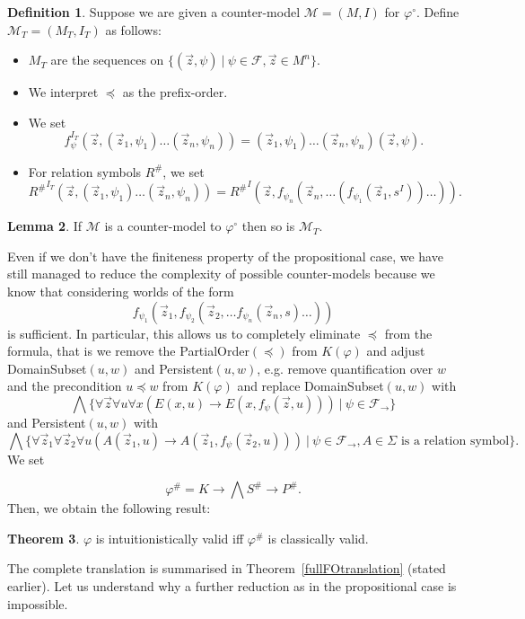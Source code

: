 \documentclass[a4paper,12pt]{report}
\theoremstyle{definition}
\newtheorem{theorem}{Theorem}[section]
\theoremstyle{definition}
\theoremstyle{definition}
\newtheorem{lemma}[theorem]{Lemma}
\theoremstyle{definition}
\theoremstyle{definition}
\newtheorem{definition}[theorem]{Definition}
\theoremstyle{definition}
\theoremstyle{definition}
\begin{document}
	\begin{definition}
		Suppose we are given a counter-model $\mathcal M = (M, I)$ for $\varphi^\circ$. Define $\mathcal M_T = (M_T, I_T)$ as follows:
		\begin{itemize}
			\item $M_T$ are the sequences on $\{(\vec z, \psi)\:|\:\psi\in \mathcal F, \vec z\in M^n\}$.
			\item We interpret $\preceq$ as the prefix-order.
			\item We set $$f_\psi^{I_T}(\vec z, (\vec z_1, \psi_1)\dots (\vec z_n, \psi_n)) = (\vec z_1, \psi_1)\dots (\vec z_n, \psi_n)(\vec z, \psi).$$
			\item For relation symbols $R^\#$, we set $${R^\#}^{I_T}(\vec z, (\vec z_1, \psi_1)\dots (\vec z_n, \psi_n)) = {R^\#}^I(\vec z, f_{\psi_n}(\vec z_n, \dots(f_{\psi_1}(\vec z_1, s^I))\dots)).$$
		\end{itemize}
	\end{definition}
	
	\begin{lemma}
		If $\mathcal M$ is a counter-model to $\varphi^\circ$ then so is $\mathcal M_T$.
	\end{lemma}
	
	Even if we don't have the finiteness property of the propositional case, we have still managed to reduce the complexity of possible counter-models because we know that considering worlds of the form $$f_{\psi_1}(\vec z_1, f_{\psi_2}(\vec z_2, \dots f_{\psi_n}(\vec z_n, s)\dots))$$ is sufficient.
	In particular, this allows us to completely eliminate $\preceq$ from the formula, that is we remove the PartialOrder$(\preceq)$
	from $K(\varphi)$ and adjust DomainSubset$(u, w)$ and Persistent$(u, w)$, e.g. remove quantification over $w$ and the precondition $u\preceq w$ from $K(\varphi)$ and replace DomainSubset$(u, w)$ with
	$$\bigwedge\{\forall \vec z\forall u\forall x(E(x, u)\to E(x, f_\psi(\vec z, u)))\:|\:\psi\in\mathcal F_\to\}$$ and Persistent$(u, w)$ with $$\bigwedge\{\forall\vec z_1\forall\vec z_2\forall u(A(\vec z_1, u)\to A(\vec z_1, f_\psi(\vec z_2, u)))\:|\:\psi\in\mathcal F_\to, \text{$A\in\Sigma$ is a relation symbol}\}.$$ We set
	
	$$\varphi^{\#} = K\to \bigwedge S^\#\to P^\#.$$
	Then, we obtain the following result:
	\begin{theorem}
		\label{thm:fo-reduction}
		$\varphi$ is intuitionistically valid iff $\varphi^\#$ is classically valid.
	\end{theorem}
	The complete translation is summarised in Theorem~\ref{fullFOtranslation} (stated earlier). Let us understand why a further reduction as in the propositional case is impossible.
	
\end{document}
